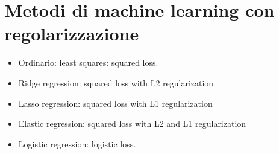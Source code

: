 \section{Metodi di machine learning con regolarizzazione}
\begin{multicols}{2}
	\begin{itemize}
		\item Ordinario: least squares: squared loss.
		\item Ridge regression: squared loss with L2 regularization
		\item Lasso regression: squared loss with L1 regularization
		\item Elastic regression: squared loss with L2 and L1 regularization
		\item Logistic regression: logistic loss.
	\end{itemize}
\end{multicols}
